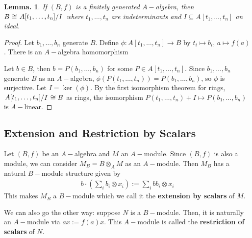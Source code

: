 \documentclass[11pt, a4paper]{memoir}
\theoremstyle{change}
\newtheorem{lemma}[theorem]{Lemma.}
\theoremstyle{plain}
\theoremstyle{nonumberplain}
\newtheorem{proof}{Proof}
\newcommand{\quot}[2]{\mathchoice{\left.\raisebox{0.10em}{$#1$}\middle/\raisebox{-0.10em}{$#2$}\right.}
                                 {\left.\raisebox{0.04em}{$#1$}\middle/\raisebox{-0.04em}{$#2$}\right.}
                                 {\left.\raisebox{0.01em}{$#1$}\middle/\raisebox{-0.01em}{$#2$}\right.}
                                 {\left.\raisebox{0em}{$#1$}\middle/\raisebox{0em}{$#2$}\right.}}
\numberwithin{equation}{section}
\begin{document}
\begin{lemma}
    If $(B,f)$ is a finitely generated $A-$algebra, then $B\cong\quot{A[t_1,\ldots,t_n]}{I}$ where $t_1,\ldots,t_n$ are indeterminants and $I\subseteq A[t_1,\ldots,t_n]$ an ideal.
\end{lemma}
\begin{proof}
    Let $b_1,\ldots,b_n$ generate $B$.
    Define $\phi:A[t_1,\ldots,t_n]\to B$ by $t_i\mapsto b_i$, $a\mapsto f(a)$.
    There is an $A-$algebra homomorphism
    \begin{center}
    \end{center}
    Let $b\in B$, then $b=P(b_1,\ldots,b_n)$ for some $P\in A[t_1,\ldots,t_n]$.
    Since $b_1,\ldots,b_n$ generate $B$ as an $A-$algebra, $\phi(P(t_1,\ldots,t_n))=P(b_1,\ldots,b_n)$, so $\phi$ is surjective.
    Let $I=\ker(\phi)$.
    By the first isomorphism theorem for rings, $\quot{A[t_1,\ldots,t_n]}{I}\cong B$ as rings, the isomorphism $P(t_1,\ldots,t_n)+I\mapsto P(b_1,\ldots,b_n)$ is $A-$linear.
\end{proof}
\subsection{Extension and Restriction by Scalars}
Let $(B,f)$ be an $A-$algebra and $M$ an $A-$module.
Since $(B,f)$ is also a module, we can consider $M_B=B\otimes_A M$ as an $A-$module.
Then $M_B$ has a natural $B-$module structure given by
\begin{align*}
    b\cdot\left(\sum_i b_i\otimes x_i\right):=\sum_i bb_i\otimes x_i
\end{align*}
This makes $M_B$ a $B-$module which we call it the \textbf{extension by scalars} of $M$.

We can also go the other way: suppose $N$ is a $B-$module.
Then, it is naturally an $A-$module via $ax:=f(a)x$.
This $A-$module is called the \textbf{restriction of scalars} of $N$.
\end{document}
